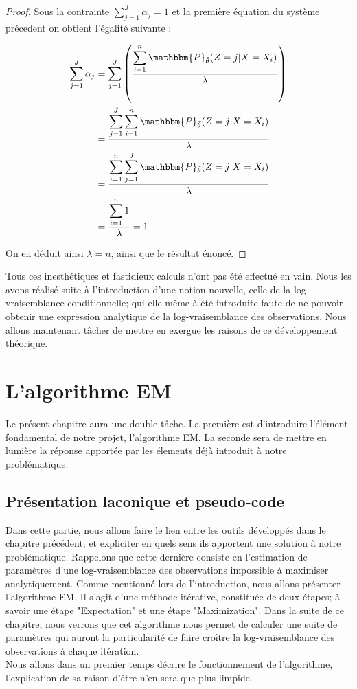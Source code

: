 \documentclass[frenchb]{report}
\newcommand{\1}{\mathbbm{1}}
\newcommand{\prob}{\mathbbm{P}}
\newcommand{\thetat}{\tilde{\theta}}
\theoremstyle{definition}\newtheorem{defn}{Définition}
\theoremstyle{definition}\newtheorem{exm}{Exemple}
\theoremstyle{definition}\newtheorem{nota}{Notation}
\theoremstyle{definition}\newtheorem{rem}{Remarque}
\begin{document}
\begin{proof}
Sous la contrainte $\displaystyle\sum_{j=1}^J\alpha_j =1$ et la première équation du système précedent on obtient l'égalité suivante : 

\begin{align*}
\sum_{j=1}^J\alpha_j &= \sum_{j=1}^J \left(\frac{\displaystyle\sum_{i=1}^n \prob_{\thetat}(Z=j|X=X_i)}{\lambda}\right)\\
&=\displaystyle\frac{\displaystyle\sum_{j=1}^J \sum_{i=1}^n \prob_{\thetat}(Z=j|X=X_i)}{\lambda}\\
&=\displaystyle\frac{\displaystyle\sum_{i=1}^n \sum_{j=1}^J \prob_{\thetat}(Z=j|X=X_i)}{\lambda}\\
&=\displaystyle\frac{\displaystyle\sum_{i=1}^n 1}{\lambda}= 1\\
\end{align*}

On en déduit ainsi $\lambda = n$, ainsi que le résultat énoncé.
\end{proof}


Tous ces inesthétiques et fastidieux calculs n'ont pas été effectué en vain. Nous les avons réalisé suite à l'introduction d'une notion nouvelle, celle de la log-vraisemblance conditionnelle; qui elle même à été introduite faute de ne pouvoir obtenir une expression analytique de la log-vraisemblance des observations. Nous allons maintenant tâcher de mettre en exergue les raisons de ce développement théorique.

\pagebreak
\chapter{L'algorithme EM}

Le présent chapitre aura une double tâche. La première est d'introduire l'élément fondamental de notre projet, l'algorithme EM. La seconde sera de mettre en lumière la réponse apportée par les élements déjà introduit à notre problématique.

\section{Présentation laconique et pseudo-code}

Dans cette partie, nous allons faire le lien entre les outils développés dans le chapitre précédent, et expliciter en quels sens ils apportent une solution à notre problématique. Rappelons que cette dernière consiste en l'estimation de paramètres d'une log-vraisemblance des observations impossible à maximiser analytiquement. Comme mentionné lors de l'introduction, nous allons présenter l'algorithme EM. Il s'agit d'une méthode itérative, constituée de deux étapes; à savoir une étape "Expectation" et une étape "Maximization". Dans la suite de ce chapitre, nous verrons que cet algorithme nous permet de calculer une suite de paramètres qui auront la particularité de faire croître la log-vraisemblance des observations à chaque itération. \\
Nous allons dans un premier temps décrire le fonctionnement de l'algorithme, l'explication de sa raison d'être n'en sera que plus limpide.
\end{document}
